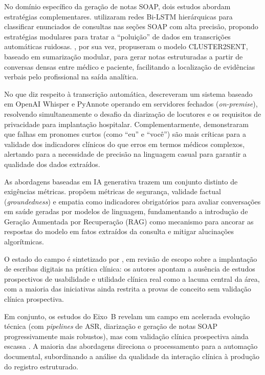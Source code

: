 \documentclass[a4paper,fleqn]{cas-sc}
\begin{document}
No domínio específico da geração de notas SOAP, dois estudos abordam
estratégias complementares. \citet{Schloss2020} utilizaram redes
Bi-LSTM hierárquicas para classificar enunciados de consultas nas
seções SOAP com alta precisão, propondo estratégias modulares para
tratar a ``poluição'' de dados em transcrições automáticas ruidosas.
\citet{Krishna2021}, por sua vez, propuseram o modelo CLUSTER2SENT,
baseado em sumarização modular, para gerar notas estruturadas a partir
de conversas densas entre médico e paciente, facilitando a localização
de evidências verbais pelo profissional na saída analítica.

No que diz respeito à transcrição automática, \citet{Klusty2025}
descreveram um sistema baseado em OpenAI Whisper e PyAnnote operando
em servidores fechados (\textit{on-premise}), resolvendo
simultaneamente o desafio da diarização de locutores e os requisitos
de privacidade para implantação hospitalar. Complementarmente,
\citet{Tran2023} demonstraram que falhas em pronomes curtos
(como \enquote{eu} e \enquote{você}) são mais críticas para a
validade dos indicadores clínicos do que erros em termos médicos
complexos, alertando para a necessidade de precisão na linguagem
casual para garantir a qualidade dos dados extraídos.

As abordagens baseadas em IA generativa trazem um conjunto distinto
de exigências métricas. \citet{Abbasian2024} propõem métricas de
segurança, validade factual (\textit{groundedness}) e empatia como
indicadores obrigatórios para avaliar conversações em saúde geradas
por modelos de linguagem, fundamentando a introdução de Geração
Aumentada por Recuperação (RAG) como mecanismo para ancorar as
respostas do modelo em fatos extraídos da consulta e mitigar
alucinações algorítmicas.

O estado do campo é sintetizado por \citet{vanBuchem2021}, em revisão
de escopo sobre a implantação de escribas digitais na prática clínica:
os autores apontam a ausência de estudos prospectivos de usabilidade
e utilidade clínica real como a lacuna central da área, com a maioria
das iniciativas ainda restrita a provas de conceito sem validação clínica prospectiva.

Em conjunto, os estudos do Eixo~B revelam um campo em acelerada
evolução técnica (com \textit{pipelines} de ASR, diarização e
geração de notas SOAP progressivamente mais robustos), mas com
validação clínica prospectiva ainda escassa \citep{vanBuchem2021}.
A maioria das abordagens direciona o processamento para a automação
documental, subordinando a análise da qualidade da interação clínica
à produção do registro estruturado.
\end{document}
